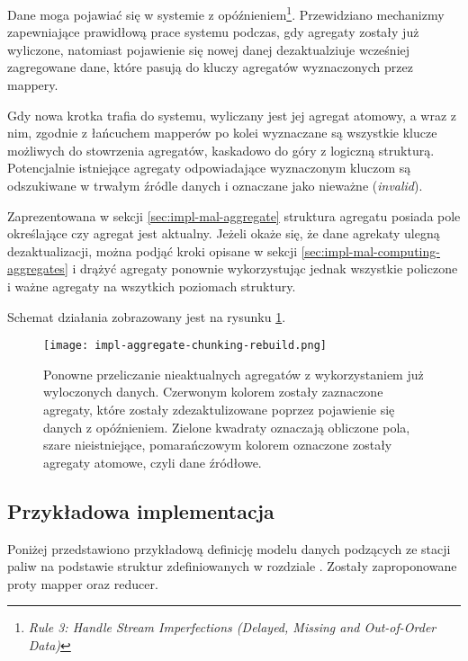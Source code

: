 Dane moga pojawiać się w systemie z opóźnieniem\cite{stream-processing-streamsql}\footnote{\emph{Rule 3: Handle Stream Imperfections (Delayed, Missing and Out-of-Order Data)}}. Przewidziano mechanizmy zapewniające prawidłową prace systemu podczas, gdy agregaty zostały już wyliczone, natomiast pojawienie się nowej danej dezaktualziuje wcześniej zagregowane dane, które pasują do kluczy agregatów wyznaczonych przez mappery.

Gdy nowa krotka trafia do systemu, wyliczany jest jej agregat atomowy, a wraz z nim, zgodnie z łańcuchem mapperów po kolei wyznaczane są wszystkie klucze możliwych do stowrzenia agregatów, kaskadowo do góry z logiczną strukturą. Potencjalnie istniejące agregaty odpowiadające wyznaczonym kluczom są odszukiwane w trwałym źródle danych i oznaczane jako nieważne (\emph{invalid}).

Zaprezentowana w sekcji \ref{sec:impl-mal-aggregate} struktura agregatu posiada pole określające czy agregat jest aktualny. Jeżeli okaże się, że dane agrekaty ulegną dezaktualizacji, można podjąć kroki opisane w sekcji \ref{sec:impl-mal-computing-aggregates} i drążyć agregaty ponownie wykorzystując jednak wszystkie policzone i ważne agregaty na wszytkich poziomach struktury.

Schemat działania zobrazowany jest na rysunku \ref{fig:impl-aggregate-chunking-rebuild}.

\begin{figure}[h!]
  \centering
    \texttt{[image: impl-aggregate-chunking-rebuild.png]}
  \caption{Ponowne przeliczanie nieaktualnych agregatów z wykorzystaniem już wyloczonych danych. Czerwonym kolorem zostały zaznaczone agregaty, które zostały zdezaktulizowane poprzez pojawienie się danych z opóźnieniem. Zielone kwadraty oznaczają obliczone pola, szare nieistniejące, pomarańczowym kolorem oznaczone zostały agregaty atomowe, czyli dane źródłowe.}
  \label{fig:impl-aggregate-chunking-rebuild}
\end{figure}

\subsection{Przykładowa implementacja}

Poniżej przedstawiono przykładową definicję modelu danych podzących ze stacji paliw na podstawie struktur zdefiniowanych w rozdziale \label{sec:impl-mal-aggregate}. Zostały zaproponowane proty mapper oraz reducer.




